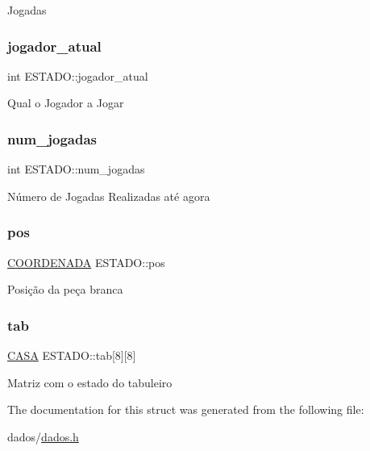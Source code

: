 Jogadas \mbox{\label{structESTADO_a5dd28e2e68b7aef2b6b7ea88e02eff58}} 
\subsubsection{\texorpdfstring{jogador\+\_\+atual}{jogador\_atual}}
{\footnotesize\ttfamily int E\+S\+T\+A\+D\+O\+::jogador\+\_\+atual}

Qual o Jogador a Jogar \mbox{\label{structESTADO_a261495728744647e618b4e623f5a4b7a}} 
\subsubsection{\texorpdfstring{num\+\_\+jogadas}{num\_jogadas}}
{\footnotesize\ttfamily int E\+S\+T\+A\+D\+O\+::num\+\_\+jogadas}

Número de Jogadas Realizadas até agora \mbox{\label{structESTADO_ab1bb13e4a70f2464766c57e64b9c78f9}} 
\subsubsection{\texorpdfstring{pos}{pos}}
{\footnotesize\ttfamily \hyperlink{structCOORDENADA}{C\+O\+O\+R\+D\+E\+N\+A\+DA} E\+S\+T\+A\+D\+O\+::pos}

Posição da peça branca \mbox{\label{structESTADO_ab56f0f1be16954d3768b4174d14c087d}} 
\subsubsection{\texorpdfstring{tab}{tab}}
{\footnotesize\ttfamily \hyperlink{dados_8h_aba91601f16d4c485b2d9b8c429f27039}{C\+A\+SA} E\+S\+T\+A\+D\+O\+::tab\mbox{[}8\mbox{]}\mbox{[}8\mbox{]}}

Matriz com o estado do tabuleiro 

The documentation for this struct was generated from the following file\+:\begin{DoxyCompactItemize}
\item 
dados/\hyperlink{dados_8h}{dados.\+h}\end{DoxyCompactItemize}

